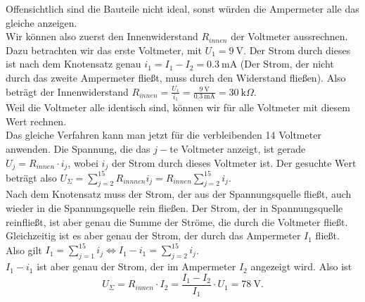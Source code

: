 \begin{Answer}[ref = voltmeter]
	Offensichtlich sind die Bauteile nicht ideal, sonst würden die Ampermeter alle das gleiche anzeigen.\\
	Wir können also zuerst den Innenwiderstand $R_{innen}$ der Voltmeter aussrechnen. Dazu betrachten wir das erste Voltmeter, mit $U_1 = 9~\mathrm{V}$. Der Strom durch dieses ist nach dem Knotensatz genau $i_1 = I_1 - I_2 = 0.3~\mathrm{mA}$ (Der Strom, der nicht durch das zweite Ampermeter fließt, muss durch den Widerstand fließen). Also beträgt der Innenwiderstand $R_{innen} = \frac{U_1}{i_1} = \frac{9~\mathrm{V}}{0.3~\mathrm{mA}} = 30~\mathrm{k}\Omega$.\\
	Weil die Voltmeter alle identisch sind, können wir für alle Voltmeter mit diesem Wert rechnen.\\
	Das gleiche Verfahren kann man jetzt für die verbleibenden 14 Voltmeter anwenden. Die Spannung, die das $j-$te Voltmeter anzeigt, ist gerade $U_j = R_{innen}\cdot i_j$, wobei $i_j$ der Strom durch dieses Voltmeter ist. Der gesuchte Wert beträgt also $U_{\Sigma} = \sum_{j=2}^{15}R_{innnen} i_j = R_{innen} \sum_{j=2}^{15} i_j$.\\
	Nach dem Knotensatz muss der Strom, der aus der Spannungsquelle fließt, auch wieder in die Spannungsquelle rein fließen. Der Strom, der in Spannungsquelle reinfließt, ist aber genau die Summe der Ströme, die durch die Voltmeter fließt. Gleichzeitig ist es aber genau der Strom, der durch das Ampermeter $I_1$ fließt. Also gilt $I_1 = \sum_{j=1}^{15}i_j \Leftrightarrow I_1 - i_1 = \sum_{j=2}^{15} i_j$.\\
	$I_1-i_1$ ist aber genau der Strom, der im Ampermeter $I_2$ angezeigt wird. Also ist 
	\begin{equation*}
	\boxed{
	U_{\Sigma} = R_{innen}\cdot I_2 = \frac{I_1-I_2}{I_1}\cdot U_1 = 78~\mathrm{V}.
	}
	\end{equation*}
	\end{Answer}